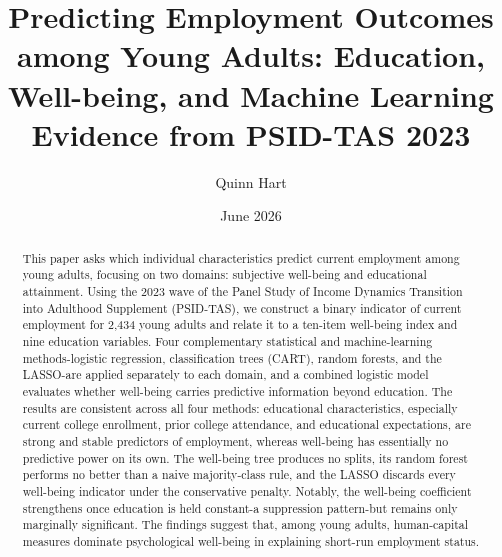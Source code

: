 \documentclass[
  11pt,
]{article}
\title{Predicting Employment Outcomes among Young Adults: Education,
Well-being, and Machine Learning Evidence from PSID-TAS 2023}
\author{Quinn Hart}
\date{June 2026}
\begin{document}
\maketitle

\begin{abstract}
This paper asks which individual characteristics predict current employment among young adults, focusing on two domains: subjective well-being and educational attainment. Using the 2023 wave of the Panel Study of Income Dynamics Transition into Adulthood Supplement (PSID-TAS), we construct a binary indicator of current employment for 2{,}434 young adults and relate it to a ten-item well-being index and nine education variables. Four complementary statistical and machine-learning methods-logistic regression, classification trees (CART), random forests, and the LASSO-are applied separately to each domain, and a combined logistic model evaluates whether well-being carries predictive information beyond education. The results are consistent across all four methods: educational characteristics, especially current college enrollment, prior college attendance, and educational expectations, are strong and stable predictors of employment, whereas well-being has essentially no predictive power on its own. The well-being tree produces no splits, its random forest performs no better than a naive majority-class rule, and the LASSO discards every well-being indicator under the conservative penalty. Notably, the well-being coefficient strengthens once education is held constant-a suppression pattern-but remains only marginally significant. The findings suggest that, among young adults, human-capital measures dominate psychological well-being in explaining short-run employment status.
\end{abstract}

\vspace{0.5em}
\end{document}
